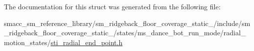 

The documentation for this struct was generated from the following file\+:\begin{DoxyCompactItemize}
\item 
smacc\+\_\+sm\+\_\+reference\+\_\+library/sm\+\_\+ridgeback\+\_\+floor\+\_\+coverage\+\_\+static\+\_/include/sm\+\_\+ridgeback\+\_\+floor\+\_\+coverage\+\_\+static\+\_/states/ms\+\_\+dance\+\_\+bot\+\_\+run\+\_\+mode/radial\+\_\+motion\+\_\+states/\hyperlink{sm__ridgeback__floor__coverage__static__1_2include_2sm__ridgeback__floor__coverage__static__1_2sb4bb6f5bcb9f13ce650ba3298698c503}{sti\+\_\+radial\+\_\+end\+\_\+point.\+h}\end{DoxyCompactItemize}
